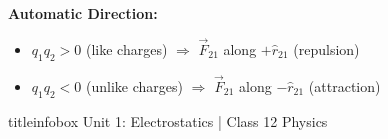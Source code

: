 \begin{frame}
\begin{formulabox}
\begin{center}
\end{center}

\vspace{0.15cm}

\textbf{Automatic Direction:}
\begin{itemize}
    \item $q_1 q_2 > 0$ (like charges) $\Rightarrow$ $\vec{F}_{21}$ along $+\hat{r}_{21}$ (repulsion)
    \item $q_1 q_2 < 0$ (unlike charges) $\Rightarrow$ $\vec{F}_{21}$ along $-\hat{r}_{21}$ (attraction)
\end{itemize}
\vspace{0.1cm}
\end{formulabox}

\vfill

\begin{beamercolorbox}[wd=\textwidth,ht=0.5cm,dp=0.1cm,center]{titleinfobox}
    \small\color{coolgray} Unit 1: Electrostatics | Class 12 Physics
\end{beamercolorbox}
\end{frame}

